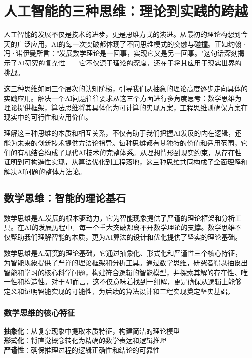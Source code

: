 
\chapter{人工智能的三种思维：理论到实践的跨越}

人工智能的发展不仅是技术的进步，更是思维方式的演进。从最初的理论构想到今天的广泛应用，AI的每一次突破都体现了不同思维模式的交融与碰撞。正如约翰·冯·诺伊曼所言："发展数学理论是一回事，实现它又是另一回事。"这句话深刻揭示了AI研究的复杂性——它不仅源于理论的深度，还在于将其应用于现实世界的挑战。

这三种思维如同三个层次的认知阶梯，引导我们从抽象的理论高度逐步走向具体的实践应用。解决一个AI问题往往要求从这三个方面进行多角度思考：数学思维为理论提供框架，算法思维将其具体化为可计算的实现方案，工程思维则确保方案在现实中的可行性和应用价值。

理解这三种思维的本质和相互关系，不仅有助于我们把握AI发展的内在逻辑，还能为未来的创新技术提供方法论指导。每种思维都有其独特的价值和适用范围，它们的有机结合构成了现代AI技术的完整体系。从理想情形到现实约束，从存在性证明到可构造性实现，从算法优化到工程落地，这三种思维共同构成了全面理解和解决AI问题的整体方法论。

\section{数学思维：智能的理论基石}

数学思维是AI发展的根本驱动力，它为智能现象提供了严谨的理论框架和分析工具。在AI的发展历程中，每一个重大突破都离不开数学理论的支撑。数学思维不仅帮助我们理解智能的本质，更为AI算法的设计和优化提供了坚实的理论基础。

数学思维是AI研究的理论基础，它通过抽象化、形式化和严谨性三个核心特征，为智能现象提供了严谨的理论框架和分析工具。通过数学思维，研究者得以抽象出智能和学习的核心科学问题，构建符合逻辑的智能模型，并探索其解的存在性、唯一性和构造性。对于AI而言，这不仅意味着找到一组解，更是确保从逻辑上能够定义和证明智能实现的可能性，为后续的算法设计和工程实现奠定坚实基础。

\subsection{数学思维的核心特征}

\begin{tcolorbox}[colback=blue!5!white,colframe=blue!75!black,title=核心概念：数学思维的三大特征]
\textbf{抽象化}：从复杂现象中提取本质特征，构建简洁的理论模型\\
\textbf{形式化}：将直觉概念转化为精确的数学表达和逻辑推理\\
\textbf{严谨性}：确保推理过程的逻辑正确性和结论的可靠性
\end{tcolorbox}

